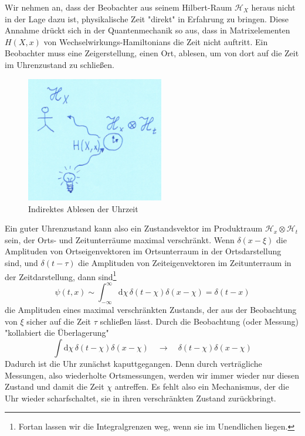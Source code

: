 \documentclass[12pt]{article}
\begin{document}
Wir nehmen an, dass der Beobachter aus seinem Hilbert-Raum $\mathscr{H}_X$ heraus nicht in der Lage dazu ist, physikalische Zeit "direkt" in Erfahrung zu bringen. Diese Annahme drückt sich in der Quantenmechanik so aus, dass in Matrixelementen $H(X,x)$ von Wechselwirkungs-Hamiltonians die Zeit nicht auftritt. Ein Beobachter muss eine Zeigerstellung, einen Ort, ablesen, um von dort auf die Zeit im Uhrenzustand zu schließen. 

\begin{figure}[!h]\begin{center}
  \includegraphics[width=6cm]{Quantenuhr.png}
  \caption{Indirektes Ablesen der Uhrzeit}
  \label{fig:clock}
\end{center}\end{figure}

Ein guter Uhrenzustand kann also ein Zustandsvektor im Produktraum $\mathscr{H}_x \otimes \mathscr{H}_t$ sein, der Orts- und Zeitunterräume maximal verschränkt. Wenn $\delta(x-\xi)$ die Amplituden von Ortseigenvektoren im Ortsunterraum in der Ortsdarstellung sind, und $\delta(t-\tau)$ die Amplituden von Zeiteigenvektoren im Zeitunterraum in der Zeitdarstellung, dann sind\footnote{Fortan lassen wir die Integralgrenzen weg, wenn sie im Unendlichen liegen.}
\begin{equation} 
\label{eq:psi_clock}
\psi(t,x) \sim \int_{-\infty}^{\infty} \mathrm d\chi \, \delta(t-\chi) \delta(x-\chi) = \delta(t-x)
\end{equation}
die Amplituden eines maximal verschränkten Zustands, der aus der Beobachtung von $\xi$ sicher auf die Zeit $\tau$ schließen lässt. Durch die Beobachtung (oder Messung) "kollabiert die Überlagerung"
\begin{equation} 
\label{eq:collapse}
\int \mathrm d\chi \, \delta(t-\chi) \delta(x-\chi) \quad \rightarrow \quad \delta(t-\chi)\delta(x-\chi)
\end{equation}
Dadurch ist die Uhr zunächst kaputtgegangen. Denn durch verträgliche Messungen, also wiederholte Ortsmessungen, werden wir immer wieder nur diesen Zustand und damit die Zeit $\chi$ antreffen. Es fehlt also ein Mechanismus, der die Uhr wieder scharfschaltet, sie in ihren verschränkten Zustand zurückbringt.
\end{document}
